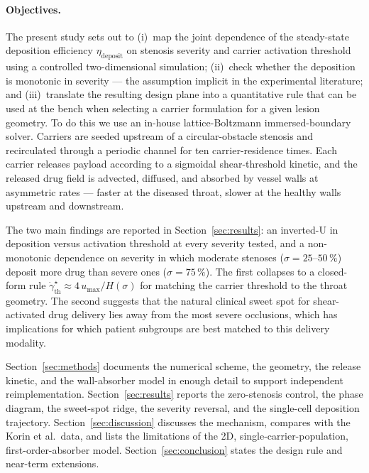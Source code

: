 \documentclass[11pt,a4paper]{article}
\begin{document}
\paragraph{Objectives.} The present study sets out to (i)~map the
joint dependence of the steady-state deposition efficiency
$\eta_{\text{deposit}}$ on stenosis severity and carrier
activation threshold using a controlled two-dimensional
simulation; (ii)~check whether the deposition is monotonic in
severity --- the assumption implicit in the experimental
literature; and (iii)~translate the resulting design plane into a
quantitative rule that can be used at the bench when selecting a
carrier formulation for a given lesion geometry. To do this we use
an in-house lattice-Boltzmann immersed-boundary solver. Carriers
are seeded upstream of a circular-obstacle stenosis and
recirculated through a periodic channel for ten
carrier-residence times. Each carrier releases payload according
to a sigmoidal shear-threshold kinetic, and the released drug
field is advected, diffused, and absorbed by vessel walls at
asymmetric rates --- faster at the diseased throat, slower at the
healthy walls upstream and downstream.

The two main findings are reported in
Section~\ref{sec:results}: an inverted-U in deposition versus
activation threshold at every severity tested, and a
non-monotonic dependence on severity in which moderate stenoses
($\sigma = 25\text{--}50\,\%$) deposit more drug than severe ones
($\sigma = 75\,\%$). The first collapses to a closed-form rule
$\dot\gamma_{\text{th}}^{\star} \approx 4\,u_{\max}/H(\sigma)$ for
matching the carrier threshold to the throat geometry. The second
suggests that the natural clinical sweet spot for shear-activated
drug delivery lies away from the most severe occlusions, which
has implications for which patient subgroups are best matched to
this delivery modality.

Section~\ref{sec:methods} documents the numerical scheme, the
geometry, the release kinetic, and the wall-absorber model in
enough detail to support independent reimplementation.
Section~\ref{sec:results} reports the zero-stenosis control, the
phase diagram, the sweet-spot ridge, the severity reversal, and
the single-cell deposition trajectory.
Section~\ref{sec:discussion} discusses the mechanism, compares
with the Korin et al.\ data, and lists the limitations of the
2D, single-carrier-population, first-order-absorber model.
Section~\ref{sec:conclusion} states the design rule and
near-term extensions.
\end{document}
